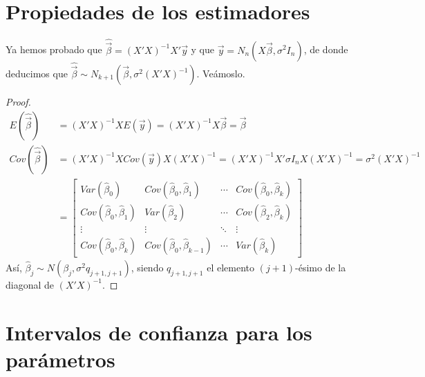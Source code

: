 \section{Propiedades de los estimadores}
\noindent Ya hemos probado que $\widehat{\vec{\beta}} = (X'X)^{-1}X'\vec{y}$ y que $\vec{y} = N_n(X\vec{\beta}, \sigma^2 I_n)$, de donde deducimos que $\widehat{\vec{\beta}} \sim N_{k+1}(\vec{\beta}, \sigma^2 (X'X)^{-1})$. Veámoslo.
\begin{proof}
    \begin{align*}
        E(\widehat{\vec{\beta}}) &= (X'X)^{-1}XE(\vec{y}) = (X'X)^{-1}X\vec{\beta} = \vec{\beta} \\
        Cov(\widehat{\vec{\beta}}) &= (X'X)^{-1}XCov(\vec{y})X(X'X)^{-1} = (X'X)^{-1}X'\sigma I_n X(X'X)^{-1} = \sigma^2 (X'X)^{-1} \\
        &= \begin{bmatrix}
    Var(\widehat{\beta}_0) & Cov(\widehat{\beta}_0, \widehat{\beta}_1) & \cdots & Cov(\widehat{\beta}_0, \widehat{\beta}_k) \\
    Cov(\widehat{\beta}_0,\widehat{\beta}_1) & Var(\widehat{\beta}_2) & \cdots & Cov(\widehat{\beta}_2, \widehat{\beta}_k) \\
    \vdots & \vdots & \ddots & \vdots \\
    Cov(\widehat{\beta}_0,\widehat{\beta}_k) & Cov(\widehat{\beta}_0, \widehat{\beta}_{k-1}) & \cdots & Var(\widehat{\beta}_k)
    \end{bmatrix}
    \end{align*}
    Así, $\widehat{\beta}_j \sim N(\beta_j, \sigma^2{q_{j+1,j+1}})$, siendo $q_{j+1,j+1}$ el elemento $(j+1)$-ésimo de la diagonal de $(X'X)^{-1}$.
\end{proof}

\section{Intervalos de confianza para los parámetros}

